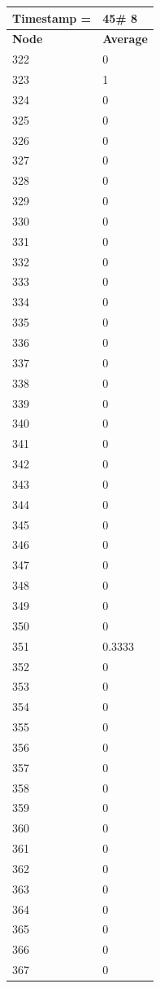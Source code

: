 \begin{tabular}{|l||l|}
\hline
\textbf{Timestamp =} & \textbf{45}\# 8\\\hline
	\textbf{Node} & \textbf{Average} \\ \hline
\hline
	322 & 0 \\ \hline
	323 & 1 \\ \hline
	324 & 0 \\ \hline
	325 & 0 \\ \hline
	326 & 0 \\ \hline
	327 & 0 \\ \hline
	328 & 0 \\ \hline
	329 & 0 \\ \hline
	330 & 0 \\ \hline
	331 & 0 \\ \hline
	332 & 0 \\ \hline
	333 & 0 \\ \hline
	334 & 0 \\ \hline
	335 & 0 \\ \hline
	336 & 0 \\ \hline
	337 & 0 \\ \hline
	338 & 0 \\ \hline
	339 & 0 \\ \hline
	340 & 0 \\ \hline
	341 & 0 \\ \hline
	342 & 0 \\ \hline
	343 & 0 \\ \hline
	344 & 0 \\ \hline
	345 & 0 \\ \hline
	346 & 0 \\ \hline
	347 & 0 \\ \hline
	348 & 0 \\ \hline
	349 & 0 \\ \hline
	350 & 0 \\ \hline
	351 & 0.3333 \\ \hline
	352 & 0 \\ \hline
	353 & 0 \\ \hline
	354 & 0 \\ \hline
	355 & 0 \\ \hline
	356 & 0 \\ \hline
	357 & 0 \\ \hline
	358 & 0 \\ \hline
	359 & 0 \\ \hline
	360 & 0 \\ \hline
	361 & 0 \\ \hline
	362 & 0 \\ \hline
	363 & 0 \\ \hline
	364 & 0 \\ \hline
	365 & 0 \\ \hline
	366 & 0 \\ \hline
	367 & 0 \\ \hline
\end{tabular}
